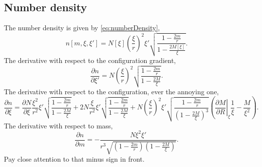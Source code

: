 \subsection{Number density}
The number density is given by \eqref{eq:numberDensity},
\begin{equation}
n[m,\xi,\xi'] = N[\xi]\left(\frac{\xi}{r}\right)^2\xi'\sqrt{\frac{1-\frac{2m}{r}}{1-\frac{2M[\xi]}{\xi}}}.
\label{eq:numberDensityExpanded}
\end{equation}
The derivative with respect to the configuration gradient,
\begin{equation}
\frac{\partial n}{\partial \xi'} = N\left(\frac{\xi}{r}\right)^2\sqrt{\frac{1-\frac{2m}{r}}{1-\frac{2M}{\xi}}}.
\label{eq:dnumberDensity:dxi}
\end{equation}
The derivative with respect to the configuration, ever the annoying one,
\begin{equation}
\frac{\partial n}{\partial \xi} = \frac{\partial N}{\partial \xi} \frac{\xi^2}{r^2}\xi'\sqrt{\frac{1-\frac{2m}{r}}{1-\frac{2M}{\xi}}} +  2N\frac{\xi}{r^2}\xi'\sqrt{\frac{1-\frac{2m}{r}}{1-\frac{2M}{\xi}}} + N\left(\frac{\xi}{r}\right)^2\xi'\sqrt{\frac{1-\frac{2m}{r}}{\left(1-\frac{2M}{\xi}\right)^3}} \left(\left.\frac{\partial M}{\partial R}\right|_\xi\frac{1}{\xi} - \frac{M}{\xi^2}\right).
\label{eq:dnumberDensity:xi}
\end{equation}
The derivative with respect to mass,
\begin{equation}
\frac{\partial n}{\partial m} = -\frac{N\xi^2\xi'}{r^3\sqrt{\left(1-\frac{2m}{r}\right) \left(1-\frac{2M}{\xi}\right)}}.
\label{eq:dnumberDensity:m}
\end{equation}
Pay close attention to that minus sign in front.

